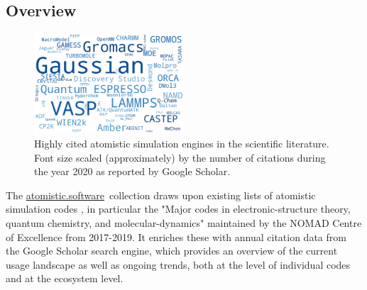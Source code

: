 \documentclass[9pt,review]{livecoms}
\newcommand{\atsoft}{\href{https://atomistic.software}{atomistic.software}\ }
\begin{document}
\subsection{Overview}

\begin{figure}
    \includegraphics[width=0.5\textwidth]{figures/wordcloud}
    \caption{
        Highly cited atomistic simulation engines in the scientific literature. 
        Font size scaled (approximately) by the number of citations during the year 2020 as reported by Google Scholar.
    }
    \label{fig:wordcloud}
\end{figure}

The \atsoft collection draws upon existing lists of atomistic simulation codes \cite{qm-codes-wiki,mm-codes-wiki,sklog-wiki,Pirhadi2016,MolSSI2021}, in particular the "Major codes in electronic-structure theory, quantum chemistry, and molecular-dynamics" \cite{Ghiringhelli2017} maintained by the NOMAD Centre of Excellence from 2017-2019. 
It enriches these with annual citation data from the Google Scholar search engine, which provides an overview of the current usage landscape as well as ongoing trends, both at the level of individual codes and at the ecosystem level.
\end{document}
